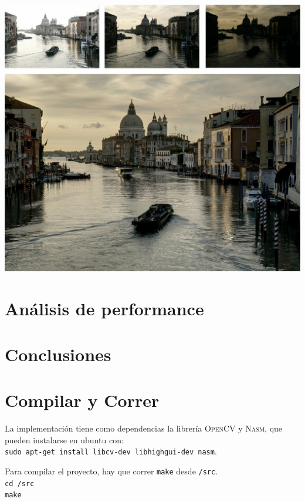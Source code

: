 \documentclass[a4paper,10pt]{article}
\begin{document}
        \includegraphics[width=\textwidth]{fused4.jpg}

    \section{Análisis de performance}

    \section{Conclusiones}
    
    \section{Compilar y Correr}
    
        La implementación tiene como dependencias la librería \textsc{OpenCV} y \textsc{Nasm}, que pueden instalarse en ubuntu con:\\
        \texttt{sudo apt-get install libcv-dev libhighgui-dev nasm}.
        
        Para compilar el proyecto, hay que correr \texttt{make} desde \texttt{/src}.\\
        \texttt{cd /src}\\
        \texttt{make}
        
\end{document}
